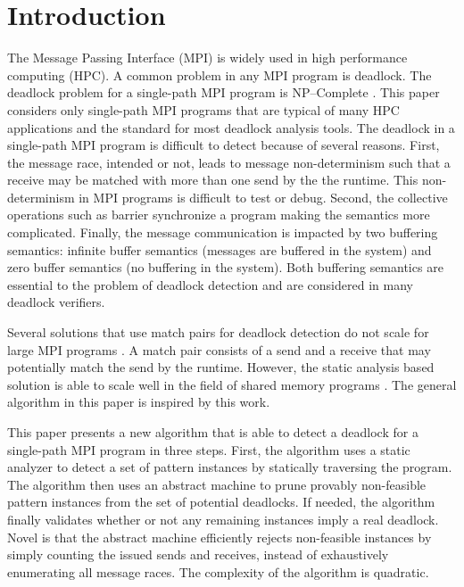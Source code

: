 \section{Introduction}

The Message Passing Interface (MPI) is widely used in high performance computing (HPC). A common problem in any MPI program is deadlock. The deadlock problem for a single-path MPI program is NP--Complete \cite{DBLP:conf/fm/ForejtKNS14}.
This paper considers only single-path MPI programs that are typical of many HPC applications and the standard for most deadlock analysis tools.  
The deadlock in a single-path MPI program is difficult to detect because of several reasons. First, the message race, intended or not, leads to message non-determinism such that a receive may be matched with more than one send by the the runtime. This non-determinism in MPI programs is difficult to test or debug. Second, the collective operations such as barrier synchronize a program making the semantics more complicated. Finally, the message communication is impacted by two buffering semantics: infinite buffer semantics (messages are buffered in the system) and zero buffer semantics (no buffering in the system). Both buffering semantics are essential to the problem of deadlock detection and are considered in many deadlock verifiers.


Several solutions that use match pairs for deadlock detection do not scale for large MPI programs \cite{DBLP:conf/ppopp/VakkalankaSGK08, DBLP:conf/sbmf/SharmaGB12, DBLP:conf/fm/ForejtKNS14}. A match pair consists of a send and a receive that may potentially match the send by the runtime. However, the static analysis based solution is able to scale well in the field of shared memory programs \cite{DBLP:conf/pldi/JoshiPSN09}. The general algorithm in this paper is inspired by this work.

This paper presents a new algorithm that is able to detect a deadlock for a single-path MPI program in three steps. First, the algorithm uses a static analyzer to detect a set of pattern instances by statically traversing the program. The algorithm then uses an abstract machine to prune provably non-feasible pattern instances from the set of potential deadlocks. If needed, the algorithm finally validates whether or not any remaining instances imply a real deadlock. Novel is that the abstract machine efficiently rejects non-feasible instances by simply counting the issued sends and receives, instead of exhaustively enumerating all message races. The complexity of the algorithm is quadratic. 

